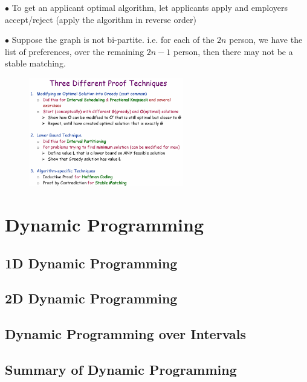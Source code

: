 \documentclass[10pt]{article}
\begin{document}
$\bullet$ To get an applicant optimal algorithm, let applicants apply and employers accept/reject (apply the algorithm in reverse order)

$\bullet$ Suppose the graph is not bi-partite. i.e. for each of the $2n$ person, we have the list of preferences, over the remaining $2n-1$ person, then there may not be a stable matching.

\begin{figure}[h]
	\centering
	\includegraphics[width=0.6\textwidth]{img5-4}
\end{figure}

\section{Dynamic Programming}

\subsection{1D Dynamic Programming}

\subsection{2D Dynamic Programming}

\subsection{Dynamic Programming over Intervals}

\subsection{Summary of Dynamic Programming}
\end{document}

